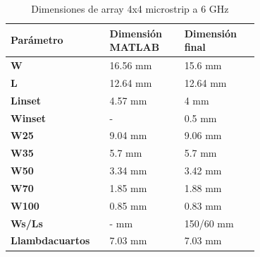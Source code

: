 \begin{table}[H]
  

   \small %
   \centering %
   \begin{tabular}{m{0.2\linewidth}m{0.25\linewidth}m{0.25\linewidth}} %
   \toprule[\heavyrulewidth]\toprule[\heavyrulewidth]
   \textbf{Parámetro} & \textbf{Dimensión MATLAB} & \textbf{Dimensión final} \\ 
   \midrule
   \textbf{W} & 16.56 mm & 15.6 mm \\
   \textbf{L} & 12.64 mm & 12.64 mm\\
   \textbf{Linset} & 4.57 mm & 4 mm\\
   \textbf{Winset} & - & 0.5 mm\\
   \textbf{W25} & 9.04 mm & 9.06 mm\\
   \textbf{W35} & 5.7 mm & 5.7 mm\\
   \textbf{W50} & 3.34 mm & 3.42 mm\\
   \textbf{W70} & 1.85 mm & 1.88 mm\\
   \textbf{W100} & 0.85 mm & 0.83 mm\\
   \textbf{Ws/Ls} & - mm & 150/60 mm\\
   \textbf{Llambdacuartos} & 7.03 mm & 7.03 mm\\
   \bottomrule[\heavyrulewidth] 
   \end{tabular}
   \caption{Dimensiones de array 4x4 microstrip a 6 GHz} 
      \label{tab:array4x42}
\end{table}

